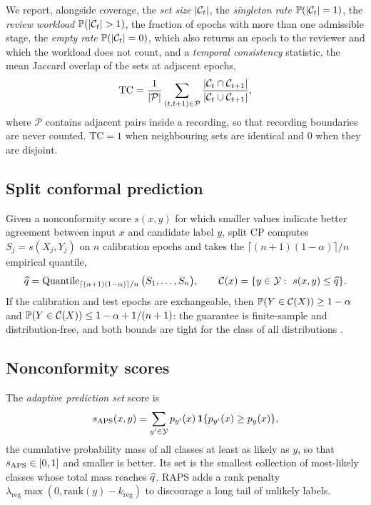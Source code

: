 We report, alongside coverage, the \emph{set size} $|\mathcal{C}_t|$, the
\emph{singleton rate} $\mathbb{P}(|\mathcal{C}_t|=1)$, the \emph{review workload}
$\bP(|\cC_t|>1)$, the fraction of epochs with more than one admissible stage,
the \emph{empty rate} $\mathbb{P}(|\mathcal{C}_t|=0)$, which also returns an epoch to the
reviewer and which the workload does not count, and a \emph{temporal
consistency} statistic, the mean Jaccard
overlap of the sets at adjacent epochs,
\begin{equation}
\mathrm{TC}=\frac{1}{|\mathcal{P}|}\sum_{(t,t+1)\in\mathcal{P}}
\frac{|\mathcal{C}_t\cap\mathcal{C}_{t+1}|}{|\mathcal{C}_t\cup\mathcal{C}_{t+1}|},
\end{equation}
where $\mathcal{P}$ contains adjacent pairs inside a recording, so that
recording boundaries are never counted. $\mathrm{TC}=1$ when neighbouring
sets are identical and $0$ when they are disjoint.

\subsection{Split conformal prediction}
\label{sec:split-cp}

Given a nonconformity score $s(x,y)$ for which smaller values indicate better
agreement between input $x$ and candidate label $y$, split CP computes
$S_j=s(X_j,Y_j)$ on $n$ calibration epochs and takes the
$\lceil(n+1)(1-\alpha)\rceil/n$ empirical quantile,
\begin{equation}
\widehat{q}=\operatorname{Quantile}_{\lceil(n+1)(1-\alpha)\rceil/n}\big(S_1,\dots,S_n\big),
\qquad
\mathcal{C}(x)=\{y\in\mathcal{Y}:\ s(x,y)\le\widehat{q}\}.
\label{eq:split-cp}
\end{equation}
If the calibration and test epochs are exchangeable, then
$\mathbb{P}(Y\in\mathcal{C}(X))\ge 1-\alpha$ and $\mathbb{P}(Y\in\mathcal{C}(X))\le 1-\alpha+1/(n+1)$: the
guarantee is finite-sample and distribution-free, and both bounds are tight
for the class of all distributions \citep{vovk2005,lei2018}.

\subsection{Nonconformity scores}
\label{sec:scores}

The \emph{adaptive prediction set} score \citep{romano2020} is
\begin{equation}
s_{\mathrm{APS}}(x,y)=\sum_{y'\in\mathcal{Y}}p_{y'}(x)\,\mathbf{1}\{p_{y'}(x)\ge p_y(x)\},
\label{eq:aps}
\end{equation}
the cumulative probability mass of all classes at least as likely as $y$, so
that $s_{\mathrm{APS}}\in[0,1]$ and smaller is better. Its set is the smallest
collection of most-likely classes whose total mass reaches $\widehat{q}$. RAPS
\citep{angelopoulos2021raps} adds a rank penalty $\lambda_{\mathrm{reg}}\max(0,\mathrm{rank}(y)-k_{\mathrm{reg}})$
to discourage a long tail of unlikely labels.

